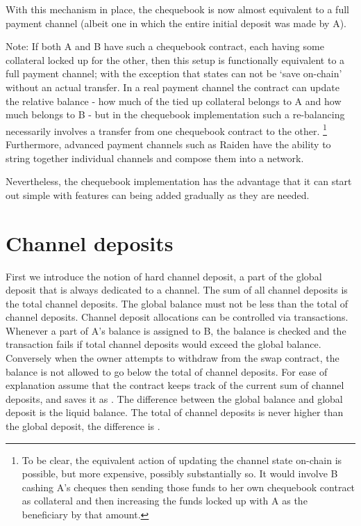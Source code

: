 With this mechanism in place, the chequebook is now almost equivalent to a full payment channel (albeit one in which the entire initial deposit was made by A).

Note: If both A and B have such a chequebook contract, each having some collateral locked up for the other, then this setup is functionally equivalent to a full payment channel; with the exception that states can not be `save on-chain' without an actual transfer. In a real payment channel the contract can update the relative balance - how much of the tied up collateral belongs to A and how much belongs to B - but in the chequebook implementation such a re-balancing necessarily involves a transfer from one chequebook contract to the other.%
%
\footnote{To be clear, the equivalent action of updating the channel state on-chain is possible, but more expensive, possibly substantially so. It would involve B cashing A's cheques then sending those funds to her own chequebook contract as collateral and then increasing the funds locked up with A as the beneficiary by that amount.} Furthermore, advanced payment channels such as Raiden \cite{citation-needed:Raiden} have the ability to string together individual channels and compose them into a network.

Nevertheless, the chequebook implementation has the advantage that it can start out simple with features can being added gradually as they are needed.

\section{Channel deposits}

First we introduce the notion of hard channel deposit, a part of the global deposit that is always dedicated to a channel. The sum of all channel deposits is the total channel deposits. The global balance must not be less than the total of channel deposits. Channel deposit allocations can be controlled via transactions. Whenever a part of A's balance is assigned to B, the balance is checked and the transaction fails if total  channel deposits would exceed the global balance.
Conversely when the owner attempts to withdraw from the swap contract, the balance is not allowed to go below the total of channel deposits. For ease of explanation assume that the contract keeps track of the current sum of channel deposits, and saves it as . The difference between the global balance and global deposit is the liquid balance. The total of channel deposits is never higher than the global deposit, the difference is .

